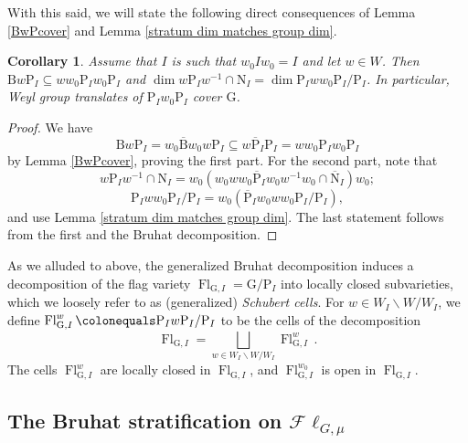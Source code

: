 \documentclass{amsart}
\newtheorem{cor}[subsubsection]{Corollary}
\theoremstyle{remark}
\numberwithin{equation}{subsection}
\DeclareMathOperator{\Flr}{Fl}
\newcommand{\ol}{\overline}
\newcommand{\sub}{\subseteq}
\newcommand{\defeq}{\colonequals}
\renewcommand{\(}{\left(}
\renewcommand{\)}{\right)}
\begin{document}
\medskip
With this said, we will state the following direct consequences of Lemma \ref{BwPcover} and Lemma \ref{stratum dim matches group dim}.

\begin{cor}\label{key properties of stratification}
Assume that $I$ is such that $w_{0}Iw_{0}=I$ and let $w\in W$. Then $\mathrm{B}w\mathrm{P}_{I} \sub ww_{0}\mathrm{P}_{I}w_{0}\mathrm{P}_{I}$ and $\dim w\mathrm{P}_{I}w^{-1}\cap \mathrm{N}_{I} = \dim \mathrm{P}_{I}ww_{0}\mathrm{P}_{I}/\mathrm{P}_{I}$. In particular, Weyl group translates of $\mathrm{P}_{I}w_{0}\mathrm{P}_{I}$ cover $\mathrm{G}$. 
\end{cor}

\begin{proof}
We have 
$$\mathrm{B}w\mathrm{P}_{I} = w_{0}\ol{\mathrm{B}}w_{0}w\mathrm{P}_{I} \sub w\ol{\mathrm{P}}_{I}\mathrm{P}_{I} = ww_{0}\mathrm{P}_{I}w_{0}\mathrm{P}_{I}$$
by Lemma \ref{BwPcover}, proving the first part. For the second part, note that 
$$ w\mathrm{P}_{I}w^{-1} \cap \mathrm{N}_{I} = w_{0}\left( w_{0}ww_{0}\ol{\mathrm{P}}_{I}w_{0}w^{-1}w_{0} \cap \ol{\mathrm{N}}_{I} \right) w_{0}; $$
$$ \mathrm{P}_{I}ww_{0}\mathrm{P}_{I}/\mathrm{P}_{I} = w_{0}\left( \ol{\mathrm{P}}_{I}w_{0}ww_{0}\mathrm{P}_{I}/\mathrm{P}_{I} \right), $$
and use Lemma \ref{stratum dim matches group dim}. The last statement follows from the first and the Bruhat decomposition.
\end{proof}

As we alluded to above, the generalized Bruhat decomposition induces a decomposition of the flag variety $\Flr_{\mathrm{G},I}= \mathrm{G}/\mathrm{P}_I$ into locally closed subvarieties, which we loosely refer to as (generalized) \emph{Schubert cells}.
For $w \in W_I \backslash W / W_I$, we define
$\Flr_{\mathrm{G},I}^{w} \defeq \mathrm{P}_I w \mathrm{P}_I / \mathrm{P}_I$
to be the cells of the decomposition
\[
\Flr_{\mathrm{G},I}= \bigsqcup_{w\in W_I\backslash W/W_I}  \Flr_{\mathrm{G},I}^w \,.
\]
The cells $\Flr_{\mathrm{G},I}^{w}$
are locally closed in $\Flr_{\mathrm{G},I}$, and $\Flr_{\mathrm{G},I}^{w_0}$
is open in $\Flr_{\mathrm{G},I}$.

\subsection{The Bruhat stratification on $\mathscr{F}\ell_{G,\mu}$}\label{bruhat stratification}
\end{document}
